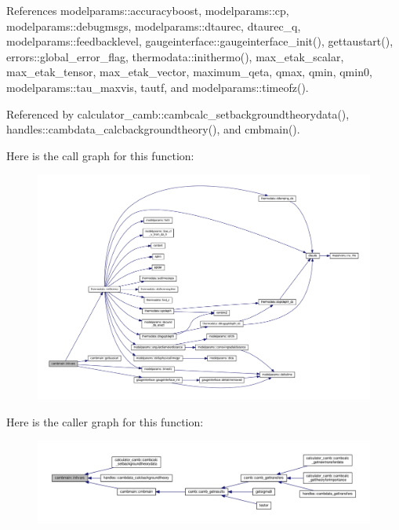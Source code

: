 References modelparams\+::accuracyboost, modelparams\+::cp, modelparams\+::debugmsgs, modelparams\+::dtaurec, dtaurec\+\_\+q, modelparams\+::feedbacklevel, gaugeinterface\+::gaugeinterface\+\_\+init(), gettaustart(), errors\+::global\+\_\+error\+\_\+flag, thermodata\+::inithermo(), max\+\_\+etak\+\_\+scalar, max\+\_\+etak\+\_\+tensor, max\+\_\+etak\+\_\+vector, maximum\+\_\+qeta, qmax, qmin, qmin0, modelparams\+::tau\+\_\+maxvis, tautf, and modelparams\+::timeofz().



Referenced by calculator\+\_\+camb\+::cambcalc\+\_\+setbackgroundtheorydata(), handles\+::cambdata\+\_\+calcbackgroundtheory(), and cmbmain().

Here is the call graph for this function\+:
\nopagebreak
\begin{figure}[H]
\begin{center}
\leavevmode
\includegraphics[width=350pt]{namespacecambmain_a890ea024560967d80a83e411a34368ed_cgraph}
\end{center}
\end{figure}
Here is the caller graph for this function\+:
\nopagebreak
\begin{figure}[H]
\begin{center}
\leavevmode
\includegraphics[width=350pt]{namespacecambmain_a890ea024560967d80a83e411a34368ed_icgraph}
\end{center}
\end{figure}
\mbox{\label{namespacecambmain_a74b9c41eb2501d8c0cc163ff7030a926}} 
